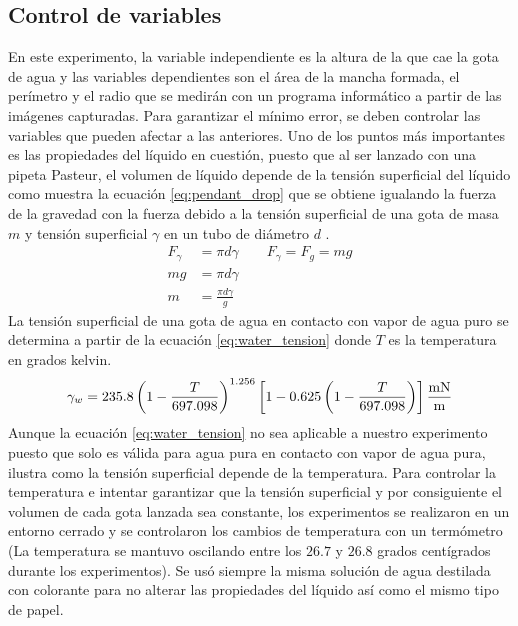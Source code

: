 \subsection{Control de variables} \label{sub:control_de_variables} En este
experimento, la variable independiente es la altura de la que cae la gota de
agua y las variables dependientes son el área de la mancha formada, el
perímetro y el radio que se medirán con un programa informático a partir de las
imágenes capturadas. Para garantizar el mínimo error, se deben controlar las
variables que pueden afectar a las anteriores.  Uno de los puntos más
importantes es las propiedades del líquido en cuestión, puesto que al ser
lanzado con una pipeta Pasteur, el volumen de líquido depende de la tensión
superficial del líquido como muestra la ecuación \ref{eq:pendant_drop} que se
obtiene igualando la fuerza de la gravedad con la fuerza debido a la tensión
superficial de una gota de masa $m$ y tensión superficial $\gamma$ en un tubo
de diámetro $d$ \cite{pendant_drop}.  \begin{align}\label{eq:pendant_drop}
    F_\gamma&=\pi d \gamma \qquad F_\gamma = F_g = mg \nonumber\\ mg &= \pi d
\gamma \nonumber\\ m &= \frac{\pi d \gamma}{g} \end{align} La tensión
superficial de una gota de agua en contacto con vapor de agua puro
\cite{water_tension2} se determina a partir de la ecuación
\ref{eq:water_tension} donde $T$ es la temperatura en grados kelvin.
\begin{equation}\label{eq:water_tension} \gamma_w = 235.8\left(
    1-\frac{T}{697.098} \right)^{1.256} \left[ 1- 0.625\left(
1-\frac{T}{697.098} \right)\right] \frac{\rm mN}{\rm m} \end{equation} Aunque
la ecuación \ref{eq:water_tension} no sea aplicable a nuestro experimento
puesto que solo es válida para agua pura en contacto con vapor de agua pura,
ilustra como la tensión superficial depende de la temperatura. Para controlar
la temperatura e intentar garantizar que la tensión superficial y por
consiguiente el volumen de cada gota lanzada sea constante, los experimentos se
realizaron en un entorno cerrado y se controlaron los cambios de temperatura
con un termómetro (La temperatura se mantuvo oscilando entre los $26.7$ y
$26.8$ grados centígrados durante los experimentos). Se usó siempre la misma
solución de agua destilada con colorante para no alterar las propiedades del
líquido así como el mismo tipo de papel.

